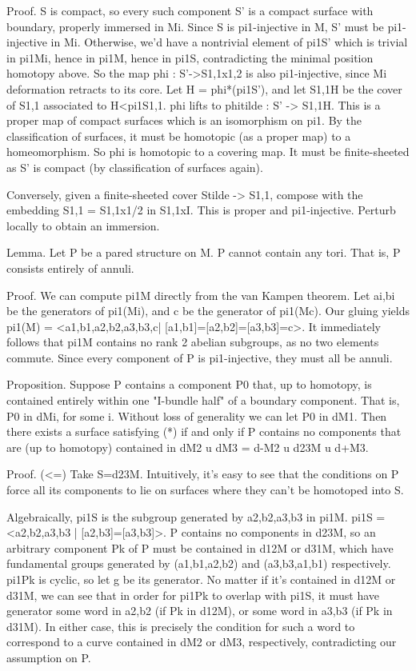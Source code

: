 \documentclass[12pt]{amsart}
\theoremstyle{definition}
\begin{document}
Proof. S is compact, so every such component S' is a compact surface with
boundary, properly immersed in Mi. Since S is pi1-injective in M, S' must be
pi1-injective in Mi. Otherwise, we'd have a nontrivial element of pi1S' which
is trivial in pi1Mi, hence in pi1M, hence in pi1S, contradicting the minimal
position homotopy above. So the map phi : S'->S1,1x{1,2} is also pi1-injective,
since Mi deformation retracts to its core. Let H = phi*(pi1S'), and let S1,1H
be the cover of S1,1 associated to H<pi1S1,1. phi lifts to phitilde : S' ->
S1,1H. This is a proper map of compact surfaces which is an isomorphism on pi1.
By the classification of surfaces, it must be homotopic (as a proper map) to
a homeomorphism. So phi is homotopic to a covering map. It must be
finite-sheeted as S' is compact (by classification of surfaces again).

Conversely, given a finite-sheeted cover Stilde -> S1,1, compose with the
embedding S1,1 = S1,1x{1/2} in S1,1xI. This is proper and pi1-injective.
Perturb locally to obtain an immersion.

Lemma. Let P be a pared structure on M. P cannot contain any tori. That is,
P consists entirely of annuli.

Proof. We can compute pi1M directly from the van Kampen theorem. Let ai,bi be
the generators of pi1(Mi), and c be the generator of pi1(Mc). Our gluing yields
pi1(M) = <a1,b1,a2,b2,a3,b3,c| [a1,b1]=[a2,b2]=[a3,b3]=c>. It immediately
follows that pi1M contains no rank 2 abelian subgroups, as no two elements
commute. Since every component of P is pi1-injective, they must all be annuli.

Proposition. Suppose P contains a component P0 that, up to homotopy, is
contained entirely within one "I-bundle half" of a boundary component. That is,
P0 in dMi, for some i. Without loss of generality we can let P0 in dM1. Then
there exists a surface satisfying (*) if and only if P contains no components
that are (up to homotopy) contained in dM2 u dM3 = d-M2 u d23M u d+M3.

Proof. (<=) Take S=d23M. Intuitively, it's easy to see that the conditions on
P force all its components to lie on surfaces where they can't be homotoped
into S.

Algebraically, pi1S is the subgroup generated by
a2,b2,a3,b3 in pi1M. pi1S = <a2,b2,a3,b3 | [a2,b3]=[a3,b3]>. P contains no
components in d23M, so an arbitrary component Pk of P  must be contained in
d12M or d31M, which have fundamental groups generated by (a1,b1,a2,b2) and
(a3,b3,a1,b1) respectively. pi1Pk is cyclic, so let g be its generator. No
matter if it's contained in d12M or d31M, we can see that in order for pi1Pk to
overlap with pi1S, it must have generator some word in a2,b2 (if Pk in d12M),
or some word in a3,b3 (if Pk in d31M). In either case, this is precisely the
condition for such a word to correspond to a curve contained in dM2 or dM3,
respectively, contradicting our assumption on P.
\end{document}
